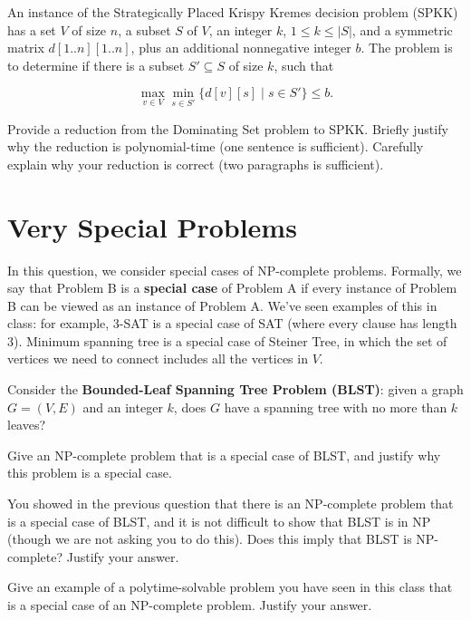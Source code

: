 \documentclass[11pt,fleqn]{exam}
\begin{document}
An instance of the Strategically Placed Krispy Kremes decision problem (SPKK) has a set $V$ of size $n$, a subset $S$ of $V$, an integer $k$, $1\le k \le |S|$,  and a symmetric matrix $d[1..n][1..n]$, plus an additional nonnegative integer $b$. The problem is to determine if there is a subset $S' \subseteq S$ of size $k$, such that

\[
\max_{v \in V} \min_{s \in S'} \{ d[v][s] \;|\; s \in S' \} \le b.
\]

\begin{questions}
\question[8]
Provide a reduction from the Dominating Set problem to SPKK.
Briefly justify why the reduction is polynomial-time (one sentence is sufficient). Carefully explain why your reduction is correct (two paragraphs is sufficient).

  \end{questions}
  
  \clearpage
  
  \section{Very Special Problems}

In this question, we consider special cases of NP-complete problems. Formally, we say that Problem B is a \textbf{special case} of Problem A if every instance of Problem B can be viewed as an instance of Problem A. We've seen examples of this in class: for example, 3-SAT is a special case of SAT (where every clause has length 3). Minimum spanning tree is a special case of Steiner Tree, in which the set of vertices we need to connect includes all the vertices in $V$.

\begin{questions}

\question[4] Consider the \textbf{Bounded-Leaf Spanning Tree Problem (BLST)}: given a graph $G = (V,E)$ and an integer $k$, does $G$ have a spanning tree with no more than $k$ leaves?

Give an NP-complete problem that is a special case of BLST, and justify why this problem is a special case.

\question[3] You showed in the previous question that there is an NP-complete problem that is a special case of BLST, and it is not difficult to show that BLST is in NP (though we are not asking you to do this). Does this imply that BLST is NP-complete? Justify your answer.

\question[4] Give an example of a polytime-solvable problem you have seen in this class that is a special case of an NP-complete problem. Justify your answer.

\end{questions}
  
\end{document}
